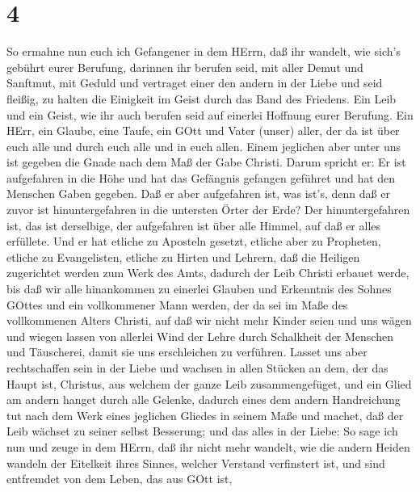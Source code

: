 \hypertarget{section-3}{%
\section{4}\label{section-3}}

 So ermahne nun euch ich Gefangener in dem HErrn, daß ihr
wandelt, wie sich's gebührt eurer Berufung, darinnen ihr berufen seid,
 mit aller Demut und Sanftmut, mit Geduld und vertraget
einer den andern in der Liebe  und seid fleißig, zu halten
die Einigkeit im Geist durch das Band des Friedens.  Ein
Leib und ein Geist, wie ihr auch berufen seid auf einerlei Hoffnung
eurer Berufung.  Ein HErr, ein Glaube, eine Taufe,
 ein GOtt und Vater (unser) aller, der da ist über euch alle
und durch euch alle und in euch allen.  Einem jeglichen aber
unter uns ist gegeben die Gnade nach dem Maß der Gabe Christi.
 Darum spricht er: Er ist aufgefahren in die Höhe und hat
das Gefängnis gefangen geführet und hat den Menschen Gaben gegeben.
 Daß er aber aufgefahren ist, was ist's, denn daß er zuvor
ist hinuntergefahren in die untersten Örter der Erde?  Der
hinuntergefahren ist, das ist derselbige, der aufgefahren ist über alle
Himmel, auf daß er alles erfüllete.  Und er hat etliche zu
Aposteln gesetzt, etliche aber zu Propheten, etliche zu Evangelisten,
etliche zu Hirten und Lehrern,  daß die Heiligen
zugerichtet werden zum Werk des Amts, dadurch der Leib Christi erbauet
werde,  bis daß wir alle hinankommen zu einerlei Glauben
und Erkenntnis des Sohnes GOttes und ein vollkommener Mann werden, der
da sei im Maße des vollkommenen Alters Christi,  auf daß
wir nicht mehr Kinder seien und uns wägen und wiegen lassen von allerlei
Wind der Lehre durch Schalkheit der Menschen und Täuscherei, damit sie
uns erschleichen zu verführen.  Lasset uns aber
rechtschaffen sein in der Liebe und wachsen in allen Stücken an dem, der
das Haupt ist, Christus,  aus welchem der ganze Leib
zusammengefüget, und ein Glied am andern hanget durch alle Gelenke,
dadurch eines dem andern Handreichung tut nach dem Werk eines jeglichen
Gliedes in seinem Maße und machet, daß der Leib wächset zu seiner selbst
Besserung; und das alles in der Liebe:  So sage ich nun und
zeuge in dem HErrn, daß ihr nicht mehr wandelt, wie die andern Heiden
wandeln der Eitelkeit ihres Sinnes,  welcher Verstand
verfinstert ist, und sind entfremdet von dem Leben, das aus GOtt ist,
